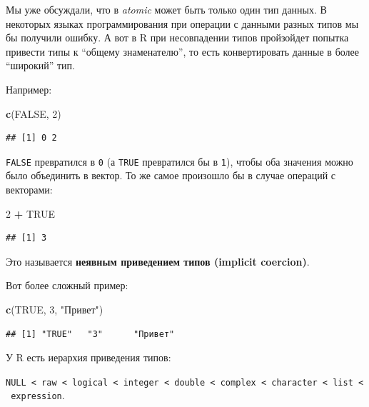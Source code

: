 \documentclass[
]{book}
\newenvironment{Shaded}{\begin{snugshade}}{\end{snugshade}}
\newcommand{\DecValTok}[1]{\textcolor[rgb]{0.00,0.00,0.81}{#1}}
\newcommand{\KeywordTok}[1]{\textcolor[rgb]{0.13,0.29,0.53}{\textbf{#1}}}
\newcommand{\NormalTok}[1]{#1}
\newcommand{\OperatorTok}[1]{\textcolor[rgb]{0.81,0.36,0.00}{\textbf{#1}}}
\newcommand{\OtherTok}[1]{\textcolor[rgb]{0.56,0.35,0.01}{#1}}
\newcommand{\StringTok}[1]{\textcolor[rgb]{0.31,0.60,0.02}{#1}}
\begin{document}
Мы уже обсуждали, что в \emph{atomic} может быть только один тип данных. В некоторых языках программирования при операции с данными разных типов мы бы получили ошибку. А вот в R при несовпадении типов пройзойдет попытка привести типы к ``общему знаменателю'', то есть конвертировать данные в более ``широкий'' тип.

Например:

\begin{Shaded}
\begin{Highlighting}[]
\KeywordTok{c}\NormalTok{(}\OtherTok{FALSE}\NormalTok{, }\DecValTok{2}\NormalTok{)}
\end{Highlighting}
\end{Shaded}

\begin{verbatim}
## [1] 0 2
\end{verbatim}

\texttt{FALSE} превратился в \texttt{0} (а \texttt{TRUE} превратился бы в \texttt{1}), чтобы оба значения можно было объединить в вектор. То же самое произошло бы в случае операций с векторами:

\begin{Shaded}
\begin{Highlighting}[]
\DecValTok{2} \OperatorTok{+}\StringTok{ }\OtherTok{TRUE}
\end{Highlighting}
\end{Shaded}

\begin{verbatim}
## [1] 3
\end{verbatim}

Это называется \textbf{неявным приведением типов (implicit coercion)}.

Вот более сложный пример:

\begin{Shaded}
\begin{Highlighting}[]
\KeywordTok{c}\NormalTok{(}\OtherTok{TRUE}\NormalTok{, }\DecValTok{3}\NormalTok{, }\StringTok{"Привет"}\NormalTok{)}
\end{Highlighting}
\end{Shaded}

\begin{verbatim}
## [1] "TRUE"   "3"      "Привет"
\end{verbatim}

У R есть иерархия приведения типов:

\texttt{NULL\ \textless{}\ raw\ \textless{}\ logical\ \textless{}\ integer\ \textless{}\ double\ \textless{}\ complex\ \textless{}\ character\ \textless{}\ list\ \textless{}\ expression}.
\end{document}
